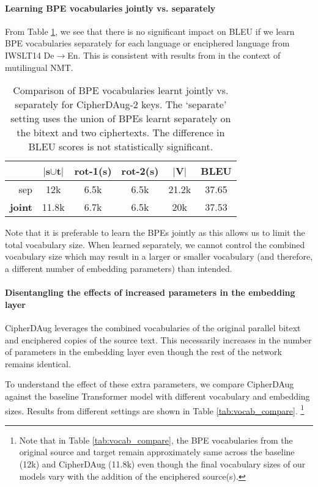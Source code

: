 \documentclass[11pt]{article}
\begin{document}
\paragraph{Learning BPE vocabularies jointly vs. separately}
From Table \ref{tab:my_label}, we see that 
there is no significant impact on BLEU
if we 
learn BPE vocabularies separately for each language or enciphered language from IWSLT14 De$\rightarrow$En.
This is consistent with results from \citet{neubig-hu-2018-rapid} in the context of mutilingual NMT.
\begin{table}[!ht]
\small
    \centering
    \begin{tabular}{rccccc}
    \toprule
         & $|$s$\cup$t$|$ & rot-1(s) & rot-2(s) & $|$V$|$ & BLEU \\ \midrule
    sep &  12k & 6.5k & 6.5k & 21.2k & 37.65 \\
    \textbf{joint} &  11.8k & 6.7k & 6.5k & 20k & 37.53 \\
    \bottomrule
    \end{tabular}
    \caption{Comparison of BPE vocabularies learnt jointly vs. separately for CipherDAug-2 keys. The `separate' setting uses the union of BPEs learnt separately on the bitext and two ciphertexts. The difference in BLEU scores is not statistically significant.}
    \label{tab:my_label}
\end{table}

Note that it is preferable to learn the BPEs jointly as this allows us to limit the total vocabulary size. When learned separately, we cannot control the combined vocabulary size which may result in a larger or smaller vocabulary (and therefore, a different number of embedding parameters) than intended.

\paragraph{Disentangling the effects of increased parameters in the embedding layer}\label{sec:emb_sizes}

CipherDAug leverages the combined vocabularies of the original parallel bitext and enciphered copies of the source text. This necessarily increases in the number of parameters in the embedding layer even though the rest of the network remains identical. 

To understand the effect of these extra parameters, we compare CipherDAug against the baseline Transformer model with different vocabulary and embedding sizes. Results from different settings are shown in Table \ref{tab:vocab_compare}. \footnote{Note that in Table \ref{tab:vocab_compare}, the BPE vocabularies from the original source and target remain approximately same across the baseline (12k) and CipherDAug (11.8k) even though the final vocabulary sizes of our models vary with the addition of the enciphered source(s).}
\end{document}
